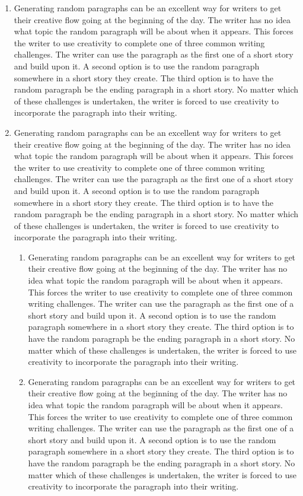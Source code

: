\documentclass{article}
\begin{document}
\begin{enumerate}
    \item Generating random paragraphs can be an excellent way for
    writers to get their creative flow going at the beginning of the day.
    The writer has no idea what topic the random paragraph will be about when it appears. This forces the writer to use creativity to complete one of three common writing challenges. The writer can use the paragraph as the first one of a short story and build upon it. A second option is to use the random paragraph somewhere in a short story they create. The third option is to have the random paragraph be the ending paragraph in a short story. No matter which of these challenges is undertaken, the writer is forced to use creativity to incorporate the paragraph into their writing.
    
    \item Generating random paragraphs can be an excellent way for writers to get their creative flow going at the beginning of the day. The writer has no idea what topic the random paragraph will be about when it appears. This forces the writer to use creativity to complete one of three common writing challenges. The writer can use the paragraph as the first one of a short story and build upon it. A second option is to use the random paragraph somewhere in a short story they create. The third option is to have the random paragraph be the ending paragraph in a short story. No matter which of these challenges is undertaken, the writer is forced to use creativity to incorporate the paragraph into their writing.
    \begin{enumerate}
        \item Generating random paragraphs can be an excellent way for writers to get their creative flow going at the beginning of the day. The writer has no idea what topic the random paragraph will be about when it appears. This forces the writer to use creativity to complete one of three common writing challenges. The writer can use the paragraph as the first one of a short story and build upon it. A second option is to use the random paragraph somewhere in a short story they create. The third option is to have the random paragraph be the ending paragraph in a short story. No matter which of these challenges is undertaken, the writer is forced to use creativity to incorporate the paragraph into their writing.
        \item Generating random paragraphs can be an excellent way for writers to get their creative flow going at the beginning of the day. The writer has no idea what topic the random paragraph will be about when it appears. This forces the writer to use creativity to complete one of three common writing challenges. The writer can use the paragraph as the first one of a short story and build upon it. A second option is to use the random paragraph somewhere in a short story they create. The third option is to have the random paragraph be the ending paragraph in a short story. No matter which of these challenges is undertaken, the writer is forced to use creativity to incorporate the paragraph into their
        writing.
    \end{enumerate}
\end{enumerate}
\end{document}
